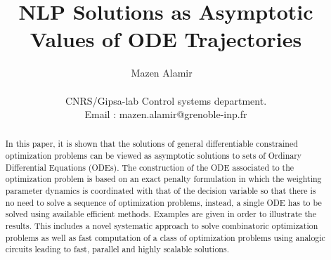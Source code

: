 \documentclass{article}
\begin{document}
\title{NLP Solutions as Asymptotic Values of ODE Trajectories}
\author{Mazen Alamir \ \\ \ \\  CNRS/Gipsa-lab Control systems department.\\ Email : mazen.alamir@grenoble-inp.fr}




\date{}



\maketitle

\begin{abstract}
\noindent In this paper, it is shown that the solutions of general differentiable constrained optimization problems can be viewed as asymptotic solutions to  sets of Ordinary Differential Equations (ODEs). The construction of the ODE associated to the optimization problem is based on an exact penalty formulation in which the weighting parameter dynamics is coordinated with that of the decision variable so that there is no need to solve a sequence of optimization problems, instead, a single ODE has to be solved using available efficient methods. Examples are given in order to illustrate the results. This includes a novel systematic approach to solve combinatoric optimization problems as well as fast computation of a class of optimization problems using analogic circuits leading to fast, parallel and highly scalable solutions.
\end{abstract}
\end{document}
